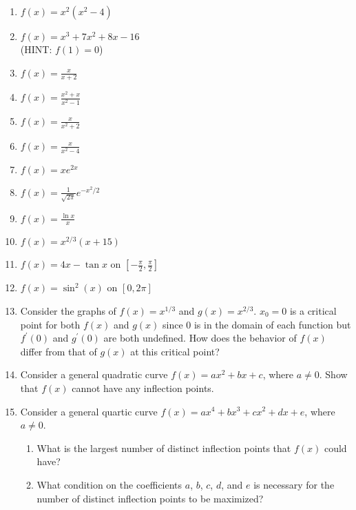 \documentclass[12pt]{article}
\begin{document}
\begin{enumerate}

\item $f(x)=x^2(x^2-4)$

\item $f(x)=x^3+7x^2+8x-16$\\
(HINT: $f(1)=0$)

\item $f(x)=\frac{x}{x+2}$

\item $f(x)=\frac{x^2+x}{x^2-1}$

\item $f(x)=\frac{x}{x^2+2}$

\item $f(x)=\frac{x}{x^2-4}$

\item $f(x)=xe^{2x}$

\item $f(x)=\frac{1}{\sqrt{2\pi}}e^{-x^2/2}$

\item $f(x)=\frac{\ln{x}}{x}$

\item $f(x)=x^{2/3}(x+15)$

\item $f(x)=4x-\tan{x}$ on $\left[-\frac{\pi}{2},\frac{\pi}{2}\right]$

\item $f(x)=\sin^{2}{(x)}$ on $[0,2\pi]$

\item Consider the graphs of $f(x)=x^{1/3}$ and $g(x)=x^{2/3}$.  $x_0=0$ is a critical point for both $f(x)$ and $g(x)$ since $0$ is in the domain of each function but $f^{\prime}(0)$ and $g^{\prime}(0)$ are both undefined.  How does the behavior of $f(x)$ differ from that of $g(x)$ at this critical point?

\item Consider a general quadratic curve $f(x)=ax^2+bx+c$, where $a \neq 0$.  Show that $f(x)$ cannot have any inflection points.

\item Consider a general quartic curve $f(x)=ax^4+bx^3+cx^2+dx+e$, where $a \neq 0$.  

\begin{enumerate}

\item What is the largest number of distinct inflection points that $f(x)$ could have?  

\item What condition on the coefficients $a$, $b$, $c$, $d$, and $e$ is necessary for the number of distinct inflection points to be maximized?

\end{enumerate}

\end{enumerate}
\end{document}
